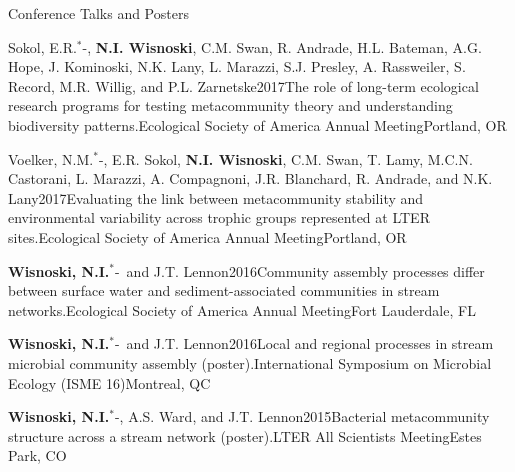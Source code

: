 \documentclass{resume} %
\newcommand{\Star}{\ensuremath{^*}\kern-\scriptspace}
\begin{document}
\begin{rhangSection}{Conference Talks and Posters}
  \begin{Presentation}{Sokol, E.R.\Star, {\bf N.I. Wisnoski}, C.M. Swan, R. Andrade, H.L. Bateman, A.G. Hope, J. Kominoski, N.K. Lany, L. Marazzi, S.J. Presley, A. Rassweiler, S. Record, M.R. Willig, and P.L. Zarnetske}{2017}{The role of long-term ecological research programs for testing metacommunity theory and understanding biodiversity patterns.}{Ecological Society of America Annual Meeting}{Portland, OR}
  \end{Presentation}
  
  \begin{Presentation}{Voelker, N.M.\Star, E.R. Sokol, {\bf N.I. Wisnoski}, C.M. Swan, T. Lamy, M.C.N. Castorani, L. Marazzi, A. Compagnoni, J.R. Blanchard, R. Andrade, and N.K. Lany}{2017}{Evaluating the link between metacommunity stability and environmental variability across trophic groups represented at LTER sites.}{Ecological Society of America Annual Meeting}{Portland, OR}
  \end{Presentation}

  \begin{Presentation}{{\bf Wisnoski, N.I.}\Star\ and J.T. Lennon}{2016}{Community assembly processes differ between surface water and sediment-associated communities in stream networks.}{Ecological Society of America Annual Meeting}{Fort Lauderdale, FL}
  \end{Presentation}

  \begin{Presentation}{{\bf Wisnoski, N.I.}\Star\ and J.T. Lennon}{2016}{Local and regional processes in stream microbial community assembly (poster).}{International Symposium on Microbial Ecology (ISME 16)}{Montreal, QC}
  \end{Presentation}

  \begin{Presentation}{{\bf Wisnoski, N.I.}\Star, A.S. Ward, and J.T. Lennon}{2015}{Bacterial metacommunity structure across a stream network (poster).}{LTER All Scientists Meeting}{Estes Park, CO}
  \end{Presentation}

\end{rhangSection}

\bigskip
\end{document}
